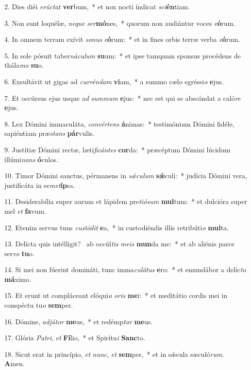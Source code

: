 2. Dies diéi \textit{e}\textit{rúc}\textit{tat} \textbf{ver}bum,~*  et nox nocti índicat \textit{sci}\textbf{én}tiam.\

3. Non sunt loquélæ, \textit{ne}\textit{que} \textit{ser}\textbf{mó}nes,~*  quorum non audiántur voces \textit{e}\textbf{ó}rum.\

4. In omnem terram exívit \textit{so}\textit{nus} \textit{e}\textbf{ó}rum:~*  et in fines orbis terræ verba \textit{e}\textbf{ó}rum.\

5. In sole pósuit taber\textit{ná}\textit{cu}\textit{lum} \textbf{su}um:~*  et ipse tamquam sponsus procédens de thála\textit{mo} \textbf{su}o.\

6. Exsultávit ut gigas ad \textit{cur}\textit{rén}\textit{dam} \textbf{vi}am,~*  a summo cælo egréssi\textit{o} \textbf{e}jus.\

7. Et occúrsus ejus usque \textit{ad} \textit{sum}\textit{mum} \textbf{e}jus:~*  nec est qui se abscóndat a caló\textit{re} \textbf{e}jus.\

8. Lex Dómini immaculáta, \textit{con}\textit{vér}\textit{tens} \textbf{á}nimas:~*  testimónium Dómini fidéle, sapiéntiam præ\textit{stans} \textbf{pár}vulis.\

9. Justítiæ Dómini rectæ, læti\textit{fi}\textit{cán}\textit{tes} \textbf{cor}da:~*  præcéptum Dómini lúcidum illúmi\textit{nans} \textbf{ó}culos.\

10. Timor Dómini sanctus, pérmanens in \textit{sǽ}\textit{cu}\textit{lum} \textbf{sǽ}culi:~*  judícia Dómini vera, justificáta in se\textit{met}\textbf{íp}sa.\

11. Desiderabília super aurum et lápidem pre\textit{ti}\textit{ó}\textit{sum} \textbf{mul}tum:~*  et dulcióra super mel \textit{et} \textbf{fa}vum.\

12. Etenim servus tuus \textit{cus}\textit{tó}\textit{dit} \textbf{e}a,~*  in custodiéndis illis retribúti\textit{o} \textbf{mul}ta.\

13. Delícta quis intélligit? \dag\  ab occúl\textit{tis} \textit{me}\textit{is} \textbf{mun}da me:~*  et ab aliénis parce ser\textit{vo} \textbf{tu}o.\

14. Si mei non fúerint domináti, tunc imma\textit{cu}\textit{lá}\textit{tus} \textbf{e}ro:~*  et emundábor a delíc\textit{to} \textbf{má}ximo.\

15. Et erunt ut compláceant elóqui\textit{a} \textit{o}\textit{ris} \textbf{me}i:~*  et meditátio cordis mei in conspéctu tu\textit{o} \textbf{sem}per.\

16. Dómine, \textit{ad}\textit{jú}\textit{tor} \textbf{me}us,~*  et redémp\textit{tor} \textbf{me}us.\

17. Glória \textit{Pa}\textit{tri}, \textit{et} \textbf{Fí}lio,~*  et Spirítu\textit{i} \textbf{Sanc}to.\

18. Sicut erat in princípio, \textit{et} \textit{nunc}, \textit{et} \textbf{sem}per,~*  et in sǽcula sæculó\textit{rum}. \textbf{A}men.\

